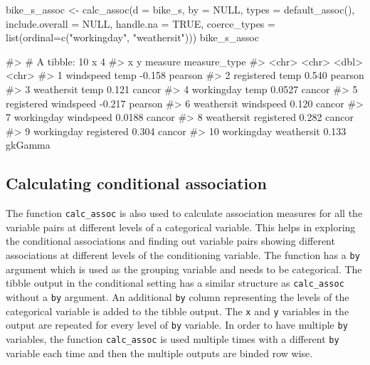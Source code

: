 \begin{Schunk}
\begin{Sinput}
bike_s_assoc <- calc_assoc(d = bike_s,
                           by = NULL,
                           types = default_assoc(),
                           include.overall = NULL,
                           handle.na = TRUE,
                           coerce_types = list(ordinal=c("workingday", "weathersit")))
bike_s_assoc
\end{Sinput}
\begin{Soutput}
#> # A tibble: 10 x 4
#>    x          y          measure measure_type
#>    <chr>      <chr>        <dbl> <chr>       
#>  1 windspeed  temp       -0.158  pearson     
#>  2 registered temp        0.540  pearson     
#>  3 weathersit temp        0.121  cancor      
#>  4 workingday temp        0.0527 cancor      
#>  5 registered windspeed  -0.217  pearson     
#>  6 weathersit windspeed   0.120  cancor      
#>  7 workingday windspeed   0.0188 cancor      
#>  8 weathersit registered  0.282  cancor      
#>  9 workingday registered  0.304  cancor      
#> 10 workingday weathersit  0.133  gkGamma
\end{Soutput}
\end{Schunk}

\hypertarget{calculating-conditional-association}{%
\subsection{Calculating conditional
association}\label{calculating-conditional-association}}

The function \texttt{calc\_assoc} is also used to calculate association
measures for all the variable pairs at different levels of a categorical
variable. This helps in exploring the conditional associations and
finding out variable pairs showing different associations at different
levels of the conditioning variable. The function has a \texttt{by}
argument which is used as the grouping variable and needs to be
categorical. The tibble output in the conditional setting has a similar
structure as \texttt{calc\_assoc} without a \texttt{by} argument. An
additional \texttt{by} column representing the levels of the categorical
variable is added to the tibble output. The \texttt{x} and \texttt{y}
variables in the output are repeated for every level of \texttt{by}
variable. In order to have multiple \texttt{by} variables, the function
\texttt{calc\_assoc} is used multiple times with a different \texttt{by}
variable each time and then the multiple outputs are binded row wise.

